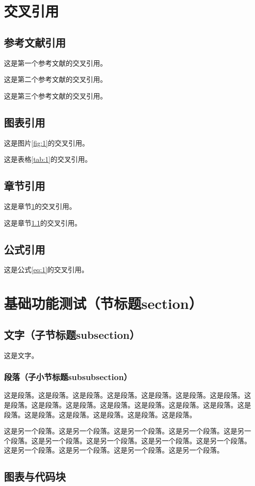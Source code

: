\begin{ujnbody}
    \section{交叉引用}\label{sec:1}
    \subsection{参考文献引用}\label{sec:2}
    这是第一个参考文献的交叉引用\cite{shannon1948mathematical}。

    这是第二个参考文献的交叉引用\cite{nash1996non}。

    这是第三个参考文献的交叉引用\cite{turing2009computing}。
    \subsection{图表引用}
    这是图片\ref{fig:1}的交叉引用。

    这是表格\ref{tab:1}的交叉引用。
    \subsection{章节引用}
    这是章节\ref{sec:1}的交叉引用。

    这是章节\ref{sec:2}的交叉引用。
    \subsection{公式引用}
    这是公式\ref{eq:1}的交叉引用。
    \section{基础功能测试（节标题section）}
    \subsection{文字（子节标题subsection）}
    这是文字。
    \subsubsection{段落（子小节标题subsubsection）}
    这是段落。这是段落。这是段落。这是段落。这是段落。这是段落。这是段落。这是段落。这是段落。这是段落。这是段落。这是段落。这是段落。这是段落。这是段落。这是段落。这是段落。这是段落。这是段落。这是段落。

    这是另一个段落。这是另一个段落。这是另一个段落。这是另一个段落。这是另一个段落。这是另一个段落。这是另一个段落。这是另一个段落。这是另一个段落。这是另一个段落。这是另一个段落。这是另一个段落。这是另一个段落。
    \subsection{图表与代码块}

\end{ujnbody}
